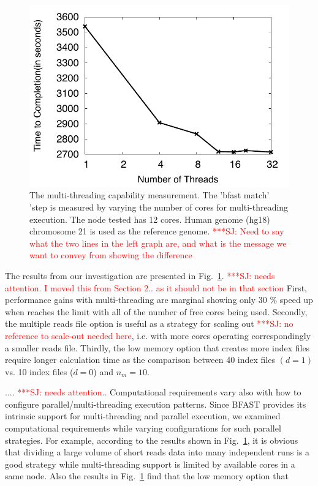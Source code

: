 \documentclass[12pt]{article}
\newcommand{\jhanote}[1]{ {\textcolor{red}     {***SJ: #1}}}
\newcommand{\jhanote}[1]{}
\begin{document}
\begin{figure}
 \centering
\includegraphics[scale=0.66]{figures/threadsvstime.pdf} 

\caption{\small The multi-threading capability measurement.  The 'bfast match' 'step is measured by varying the number of cores for multi-threading execution.  The node tested has 12 cores.  Human genome (hg18) chromosome 21 is used as the reference genome. \jhanote{Need to say what the two lines in the left graph are, and what is the message we want to convey from showing the difference} }
  \label{fig:parallel-execution} 
 \end{figure}

 The results from our investigation are presented in Fig.~\ref{fig:parallel-execution}. \jhanote{needs attention. I moved this from Section 2.. as it should not be in that section} First, performance gains with multi-threading are marginal showing only 30 \% speed up when reaches the limit with all of the number of free cores being used.  Secondly, the multiple reads file option is useful as a strategy for scaling out \jhanote{no reference to scale-out needed here}, i.e. with more cores operating correspondingly a smaller reads file.  Thirdly, the low memory option that creates more index files require longer calculation time as the comparison between 40 index files $(d = 1)$ vs. 10 index files ($ d = 0 $) and $n_m = 10$.

.... \jhanote{needs attention..} Computational requirements vary also with how to configure parallel/multi-threading execution patterns.  Since BFAST provides its intrinsic support for multi-threading and parallel execution, we examined computational requirements while varying configurations for such parallel strategies.  For example, according to the results shown in Fig.~\ref{fig:parallel-execution}, it is obvious that dividing a large volume of short reads data into many independent runs is a good strategy while multi-threading support is limited by available cores in a same node.  Also the results in Fig.~\ref{fig:parallel-execution} find that the low memory option that
\end{document}
